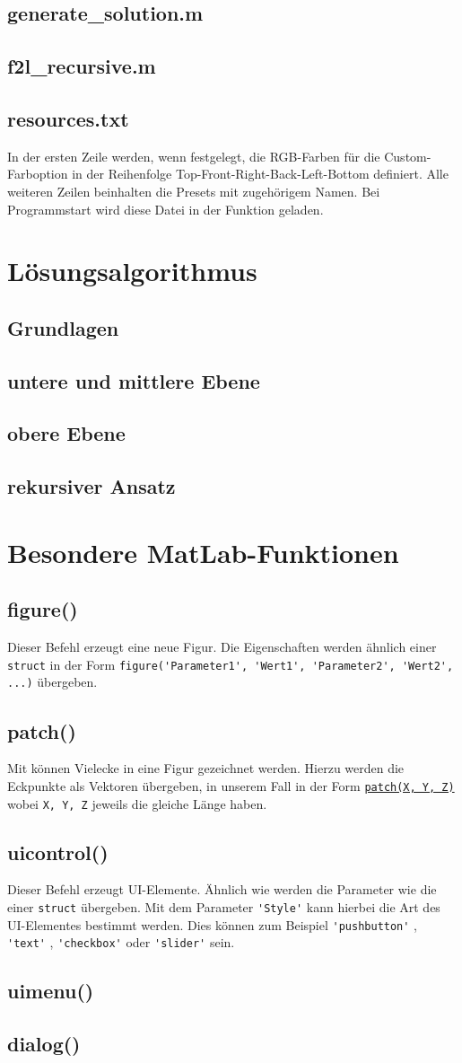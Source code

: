 \documentclass[a4paper,11pt]{scrreprt}
\newcommand{\coderef}[1]{
  \texttt{\nameref{#1}}
}
\newcommand{\codeinline}[1]{
  \lstinline!#1!
}
\newcommand{\codecustomref}[2]{
  \hyperref[#2]{\lstinline!#1!}
}
\newcommand{\chap}[2]{
  \chapter{#1}\label{#2}
}
\renewcommand{\sec}[2]{
  \section{#1}\label{#2}
}
\begin{document}
    \sec{generate\_solution.m}{generatesolution}

    \sec{f2l\_recursive.m}{f2lrecursive}

    \sec{resources.txt}{resources}
      In der ersten Zeile werden, wenn festgelegt, die RGB-Farben für die Custom-Farboption in der Reihenfolge Top-Front-Right-Back-Left-Bottom definiert. Alle weiteren Zeilen beinhalten die Presets mit zugehörigem Namen. Bei Programmstart wird diese Datei in der Funktion\coderef{loadpresets}geladen.

  \chap{Lösungsalgorithmus}{algorithm}
    \sec{Grundlagen}{grundlagen}

    \sec{untere und mittlere Ebene}{f2l}

    \sec{obere Ebene}{oben}

    \sec{rekursiver Ansatz}{recursive}

  \chap{Besondere MatLab-Funktionen}{matlab}
    \sec{figure()}{figure}
      Dieser Befehl erzeugt eine neue Figur. Die Eigenschaften werden ähnlich einer\codeinline{struct}in der Form\codeinline{figure('Parameter1', 'Wert1', 'Parameter2', 'Wert2', ...)}übergeben.

    \sec{patch()}{patch}
      Mit\coderef{patch}können Vielecke in eine Figur gezeichnet werden. Hierzu werden die Eckpunkte als Vektoren übergeben, in unserem Fall in der Form\codecustomref{patch(X, Y, Z)}{patch}wobei\codeinline{X, Y, Z}jeweils die gleiche Länge haben.

    \sec{uicontrol()}{uicontrol}
      Dieser Befehl erzeugt UI-Elemente. Ähnlich wie\coderef{figure}werden die Parameter wie die einer\codeinline{struct}übergeben. Mit dem Parameter\codeinline{'Style'}kann hierbei die Art des UI-Elementes bestimmt werden. Dies können zum Beispiel\codeinline{'pushbutton'},\codeinline{'text'},\codeinline{'checkbox'}oder\codeinline{'slider'}sein.

    \sec{uimenu()}{uimenu}

    \sec{dialog()}{dialog}
\end{document}
